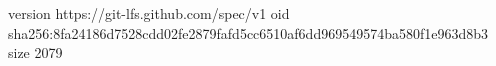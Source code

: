 version https://git-lfs.github.com/spec/v1
oid sha256:8fa24186d7528cdd02fe2879fafd5cc6510af6dd969549574ba580f1e963d8b3
size 2079

